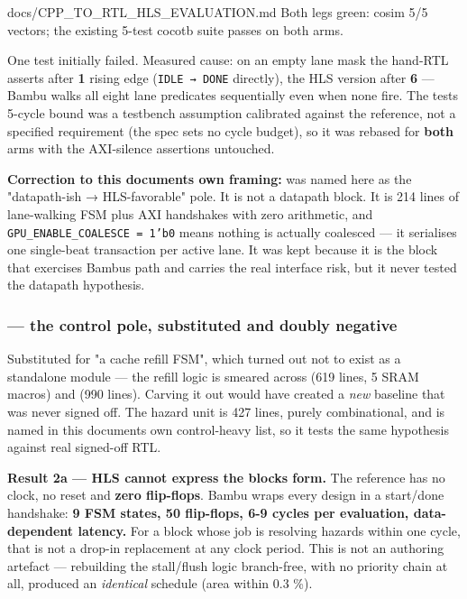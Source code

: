 \begin{relocated}{docs/CPP_TO_RTL_HLS_EVALUATION.md}
Both legs green: cosim 5/5 vectors; the existing 5-test cocotb suite
passes on both arms.

One test initially failed. Measured cause: on an empty lane mask the
hand-RTL asserts  after \textbf{1} rising edge
(\texttt{IDLE\ →\ DONE} directly), the HLS version after \textbf{6} ---
Bambu walks all eight lane predicates sequentially even when none fire.
The test\textquotesingle s 5-cycle bound was a testbench assumption
calibrated against the reference, not a specified requirement (the spec
sets no cycle budget), so it was rebased for \textbf{both} arms with the
AXI-silence assertions untouched.

\textbf{Correction to this document\textquotesingle s own framing:}
 was named here as the "datapath-ish →
HLS-favorable" pole. It is not a datapath block. It is 214 lines of
lane-walking FSM plus AXI handshakes with zero arithmetic, and
\texttt{GPU\_\allowbreak{}ENABLE\_\allowbreak{}COALESCE\ =\allowbreak{}\ 1'b0}
means nothing is actually coalesced --- it serialises one single-beat
transaction per active lane. It was kept because it is the block that
exercises Bambu\textquotesingle s  path and carries the real
interface risk, but it never tested the datapath hypothesis.

\subsubsection{\texorpdfstring{ --- the
control pole, substituted and doubly
negative}{--- the control pole, substituted and doubly negative}}\label{tm:dec:cpp-to-rtl-hls-evaluation:2-rv32i-hazard-unit-the-control-pole-substituted-and-doubly-negative}

Substituted for "a cache refill FSM", which turned out not to exist as a
standalone module --- the refill logic is smeared across
 (619 lines, 5 SRAM macros) and
 (990 lines). Carving it out would have created a
\emph{new} baseline that was never signed off. The hazard unit is 427
lines, purely combinational, and is named in this
document\textquotesingle s own control-heavy list, so it tests the same
hypothesis against real signed-off RTL.

\textbf{Result 2a --- HLS cannot express the block\textquotesingle s
form.} The reference has no clock, no reset and \textbf{zero
flip-flops}. Bambu wraps every design in a start/\allowbreak{}done
handshake: \textbf{9 FSM states, 50 flip-flops, 6-9 cycles per
evaluation, data-dependent latency.} For a block whose job is resolving
hazards within one cycle, that is not a drop-in replacement at any clock
period. This is not an authoring artefact --- rebuilding the
stall/\allowbreak{}flush logic branch-free, with no priority chain at
all, produced an \emph{identical} schedule (area within 0.3 \%).


\end{relocated}
